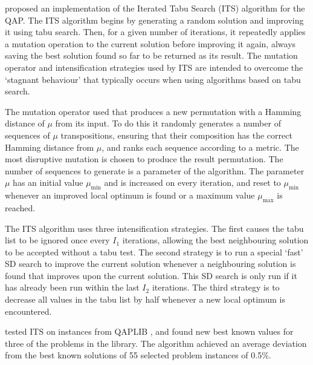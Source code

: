 {	%



	\citet{Misevicius:2012dj} proposed an implementation of the Iterated Tabu Search (ITS) algorithm for the QAP.
	The ITS algorithm begins by generating a random solution and improving it using tabu search. Then, for a given number of iterations, it repeatedly applies a mutation operation to the current solution before improving it again, always saving the best solution found so far to be returned as its result. The mutation operator and intensification strategies used by ITS are intended to overcome the `stagnant behaviour' that typically occurs when using algorithms based on tabu search.

	The mutation operator used that produces a new permutation with a Hamming distance of \(\mu\) from its input. To do this it randomly generates a number of sequences of \(\mu\) transpositions, ensuring that their composition has the correct Hamming distance from \(\mu\), and ranks each sequence according to a  metric. The most disruptive mutation is chosen to produce the result permutation.
	The number of sequences to generate is a parameter of the algorithm.
	The parameter \(\mu\) has an initial value \(\mu_\text{min}\) and is increased on every iteration, and reset to \(\mu_\text{min}\) whenever an improved local optimum is found or a maximum value \(\mu_\text{max}\) is reached.

	The ITS algorithm uses three intensification strategies.
	The first causes the tabu list to be ignored once every \(I_1\) iterations, allowing the best neighbouring solution to be accepted without a tabu test.
	The second strategy is to run a special `fast' SD search to improve the current solution whenever a neighbouring solution is found that improves upon the current solution. This SD search is only run if it has already been run within the last \(I_2\) iterations.
	The third strategy is to decrease all values in the tabu list by half whenever a new local optimum is encountered.

	\citeauthor{Misevicius:2012dj} tested ITS on instances from QAPLIB \citep{Burkard:1997ve}, and found new best known values for three of the problems in the library. The algorithm achieved an average deviation from the best known solutions of 55 selected problem instances of 0.5\%.

}
